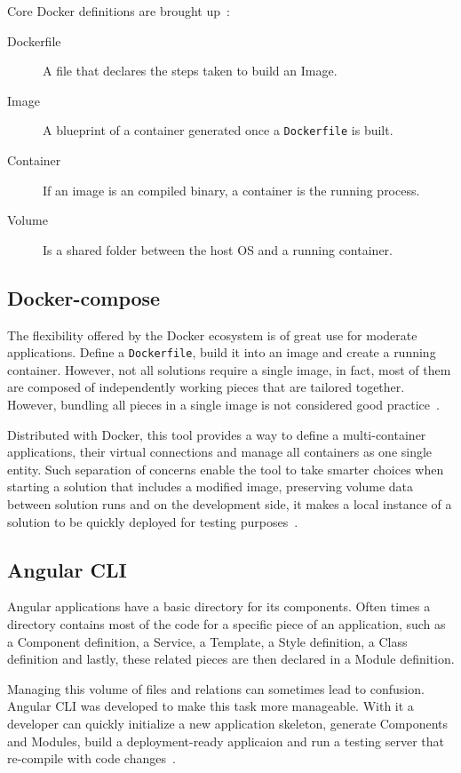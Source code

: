 Core Docker definitions are brought up~\cite{dockeroverview}:
\begin{description}
\item[Dockerfile] A file that declares the steps taken to build an Image.
\item[Image] A blueprint of a container generated once a \texttt{Dockerfile} is built.
\item[Container] If an image is an compiled binary, a container is the running process. 
\item[Volume] Is a shared folder between the host \gls{OS} and a running container.
\end{description}

\subsection{Docker-compose}
The flexibility offered by the Docker ecosystem is of great use for moderate applications. Define a \texttt{Dockerfile}, build it into an image and create a running container. However, not all solutions require a single image, in fact, most of them are composed of independently working pieces that are tailored together. However, bundling all pieces in a single image is not considered good practice~\cite{dockerfag}.

Distributed with Docker, this tool provides a way to define a multi-container applications, their virtual connections and manage all containers as one single entity. Such separation of concerns enable the tool to take smarter choices when starting a solution that includes a modified image, preserving volume data between solution runs and on the development side, it makes a local instance of a solution to be quickly deployed for testing purposes~\cite{compose}. 

\subsection{Angular CLI}\label{angularcli}
Angular applications have a basic directory for its components. Often times a directory contains most of the code for a specific piece of an application, such as a Component definition, a Service, a Template, a Style definition, a Class definition and lastly, these related pieces are then declared in a Module definition.

Managing this volume of files and relations can sometimes lead to confusion. Angular \gls{CLI} was developed to make this task more manageable. With it a developer can quickly initialize a new application skeleton, generate Components and Modules, build a deployment-ready applicaion and run a testing server that re-compile with code changes~\cite{angularcli}.

